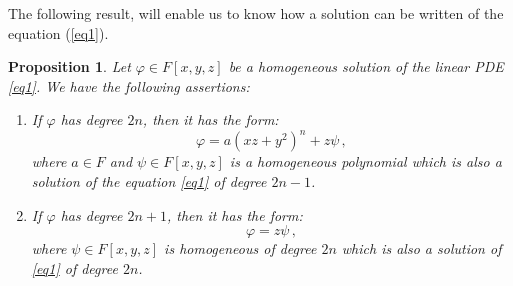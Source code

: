 \documentclass{amsart}
\newtheorem{prop}{Proposition}
\begin{document}
The following result, will enable us to know  how a solution can be written of the equation (\ref{eq1}).
\begin{prop}\label{pr1}
	Let $\varphi\in F[x,y,z]$ be a homogeneous solution of the linear PDE \eqref{eq1}. 
	We have the following assertions:
	\begin{enumerate}
		\item[ ($a$)] If $\varphi$ has degree $2n$, then it has the form: 
		\begin{equation*}
			\varphi=a(xz+y^2)^n+z\psi\,,
		\end{equation*}
		where $a\in F$ and $\psi\in F[x,y,z]$ is a homogeneous polynomial which is also a solution of the equation \eqref{eq1} of degree $2n-1$.
		\item[($b$)] If $\varphi$ has degree $2n+1$,  then it has the form: 
		\begin{equation*}
			\varphi=z\psi\,,
		\end{equation*}
		where $\psi\in F[x,y,z]$ is homogeneous of degree $2n$ which is also a solution of \eqref{eq1} of degree $2n$.
	\end{enumerate}
	
\end{prop}
\end{document}
